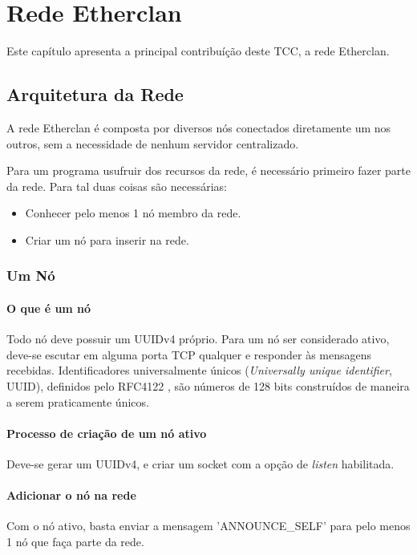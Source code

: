 \chapter{Rede Etherclan}
\label{sec:etherclan}

Este capítulo apresenta a principal contribuíção deste TCC, a rede Etherclan.

\section{Arquitetura da Rede}
\label{sec:etherclan:rede}

  A rede Etherclan é composta por diversos nós conectados diretamente um nos outros, sem a necessidade
  de nenhum servidor centralizado.
  
  Para um programa usufruir dos recursos da rede, é necessário primeiro fazer parte da rede. Para 
  tal duas coisas são necessárias:
  
  \begin{itemize}
    \item Conhecer pelo menos 1 nó membro da rede.
    \item Criar um nó para inserir na rede.
  \end{itemize}
  
  \subsection{Um Nó}
    \subsubsection{O que é um nó}
      Todo nó deve possuir um UUIDv4 próprio.
      Para um nó ser considerado ativo, deve-se escutar em alguma porta TCP qualquer e responder às
      mensagens recebidas. Identificadores universalmente únicos (\textit{Universally unique identifier},
      UUID), definidos pelo RFC4122 \cite{rfc4122}, são números de 128 bits construídos de maneira a
      serem praticamente únicos.
      
    \subsubsection{Processo de criação de um nó ativo}
      Deve-se gerar um UUIDv4, e criar um socket com a opção de \textit{listen} habilitada.

    \subsubsection{Adicionar o nó na rede}
      Com o nó ativo, basta enviar a mensagem 'ANNOUNCE\_SELF' para pelo menos 1 nó que faça parte da rede.

